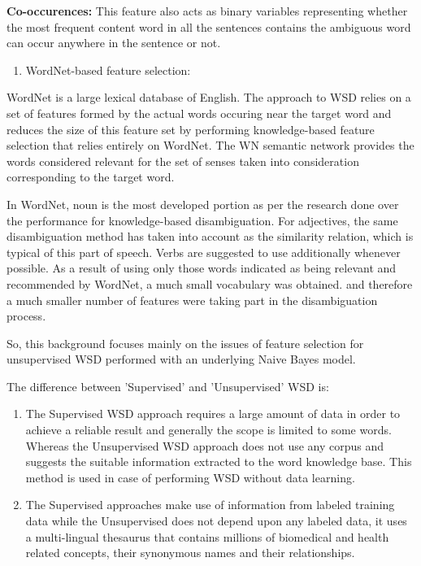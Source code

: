 \textbf{Co-occurences:} This feature also acts as binary variables representing whether the most frequent content word in all the sentences contains the ambiguous word can occur anywhere in the sentence or not.

\begin{enumerate}
	\item WordNet-based feature selection:
\end{enumerate}
WordNet is a large lexical database of English. 
The approach to WSD relies on a set of features formed by the actual words occuring near the target word and 
reduces the size of this feature set by performing knowledge-based feature selection that relies entirely on WordNet.
The WN semantic network provides the words considered relevant for the set of senses taken into consideration corresponding 
to the target word.

In WordNet, noun is the most developed portion as per the research done over the performance for knowledge-based disambiguation.
For adjectives, the same disambiguation method has taken into account as the similarity relation, which  is typical of this 
part of speech.
Verbs are suggested to use additionally whenever possible.
As a result of using only those words indicated as being relevant and recommended by WordNet, a much small vocabulary was obtained.
and therefore a much smaller number of features were taking part in the disambiguation process.

So, this background focuses mainly on the issues of feature selection for unsupervised WSD performed with an underlying Naive Bayes model.

The difference between 'Supervised' and 'Unsupervised' WSD is:

\begin{enumerate}
	\item The Supervised WSD approach requires a large amount of data in order to achieve a reliable result and generally the scope is limited to some words. 
	Whereas the Unsupervised WSD approach does not use any corpus and suggests the suitable information extracted to the word knowledge base.
	This method is used in case of performing WSD without data learning.
	\item The Supervised approaches make use of information from labeled training data while the Unsupervised does not depend upon any labeled data, 
	it uses a multi-lingual thesaurus that contains millions of biomedical and health related concepts, their synonymous names and their relationships.
\end{enumerate}

